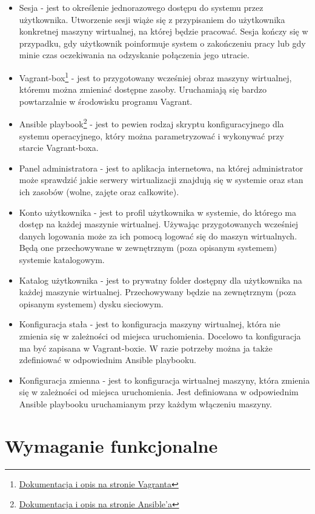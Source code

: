 \documentclass[12pt]{article}
\begin{document}
\begin{itemize}
	\item Sesja - jest to określenie jednorazowego dostępu do systemu przez użytkownika. Utworzenie sesji wiąże się z przypisaniem do użytkownika konkretnej maszyny wirtualnej, na której będzie pracować. Sesja kończy się w przypadku, gdy użytkownik poinformuje system o zakończeniu pracy lub gdy minie czas oczekiwania na odzyskanie połączenia jego utracie.
	\item Vagrant-box\footnote{\href{https://www.vagrantup.com/docs/boxes}{Dokumentacja i opis na stronie Vagranta}} - jest to przygotowany wcześniej obraz maszyny wirtualnej, któremu można zmieniać dostępne zasoby. Uruchamiają się bardzo powtarzalnie w środowisku programu Vagrant.
	\item Ansible playbook\footnote{\href{https://www.redhat.com/en/topics/automation/what-is-an-ansible-playbook\#example-of-ansible-playbook}{Dokumentacja i opis na stronie Ansible'a}} - jest to pewien rodzaj skryptu konfiguracyjnego dla systemu operacyjnego, który można parametryzować i wykonywać przy starcie Vagrant-boxa.
	\item Panel administratora - jest to aplikacja internetowa, na której administrator może sprawdzić jakie serwery wirtualizacji znajdują się w systemie oraz stan ich zasobów (wolne, zajęte oraz całkowite).
	\item Konto użytkownika - jest to profil użytkownika w systemie, do którego ma dostęp na każdej maszynie wirtualnej. Używając przygotowanych wcześniej danych logowania może za ich pomocą logować się do maszyn wirtualnych. Będą one przechowywane w zewnętrznym (poza opisanym systemem) systemie katalogowym.
	\item Katalog użytkownika - jest to prywatny folder dostępny dla użytkownika na każdej maszynie wirtualnej. Przechowywany będzie na zewnętrznym (poza opisanym systemem) dysku sieciowym.
	\item Konfiguracja stała - jest to konfiguracja maszyny wirtualnej, która nie zmienia się w zależności od miejsca uruchomienia. Docelowo ta konfiguracja ma być zapisana w Vagrant-boxie. W razie potrzeby można ja także zdefiniować w odpowiednim Ansible playbooku.
	\item Konfiguracja zmienna - jest to konfiguracja wirtualnej maszyny, która zmienia się w zależności od miejsca uruchomienia. Jest definiowana w odpowiednim Ansible playbooku uruchamianym przy każdym włączeniu maszyny.
\end{itemize}

\section{Wymaganie funkcjonalne}
\end{document}
